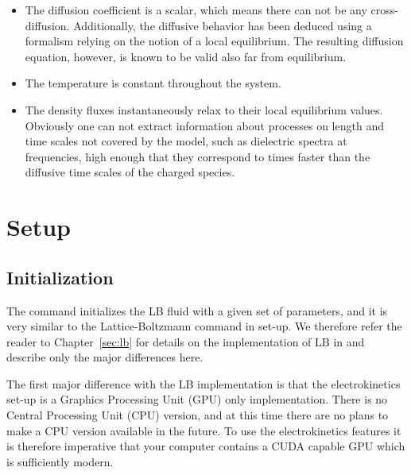 \begin{itemize}
\item The diffusion coefficient is a scalar, which means there can not
  be any cross-diffusion. Additionally, the diffusive behavior has
  been deduced using a formalism relying on the notion of a local
  equilibrium. The resulting diffusion equation, however, is known to
  be valid also far from equilibrium.
	
\item The temperature is constant throughout the system.
	
\item The density fluxes instantaneously relax to their local
  equilibrium values. Obviously one can not extract information about
  processes on length and time scales not covered by the model, such
  as dielectric spectra at frequencies, high enough that they
  correspond to times faster than the diffusive time scales of the
  charged species.
\end{itemize}

\section{Setup}

\subsection{\label{ssec:ek-init}Initialization}

\begin{essyntax}
  \begin{features}
  \end{features}
\end{essyntax}
The  command initializes the LB fluid with a given
set of parameters, and it is very similar to the \es{} Lattice-Boltzmann 
 command in set-up. We therefore refer the reader to 
Chapter~\ref{sec:lb} for details on the implementation of LB in \es{} and 
describe only the major differences here. 

The first major difference with the LB implementation is that the 
electrokinetics set-up is a Graphics Processing Unit (GPU) only implementation. 
There is no Central Processing Unit (CPU) version, and at this time there are no
plans to make a CPU version available in the future. To use the electrokinetics
features it is therefore imperative that your computer contains a CUDA capable
GPU which is sufficiently modern. 

